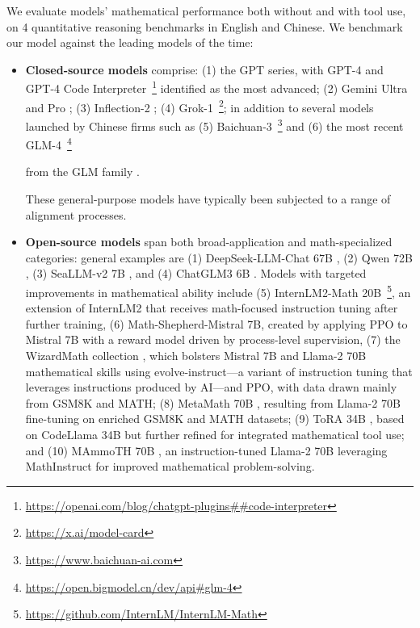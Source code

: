 \begin{itemize}[topsep=0pt]
We evaluate models' mathematical performance both without and with tool use, on 4 quantitative reasoning benchmarks in English and Chinese. We benchmark our model against the leading models of the time:

\begin{itemize}[topsep=0pt]
    \item \textbf{Closed-source models} comprise: (1) the GPT series, with GPT-4 \citep{gpt4} and GPT-4 Code Interpreter~\footnote{\url{https://openai.com/blog/chatgpt-plugins\#\#code-interpreter}} identified as the most advanced; (2) Gemini Ultra and Pro \citep{gemini}; (3) Inflection-2 \citep{inflection-2}; (4) Grok-1~\footnote{\url{https://x.ai/model-card}}; in addition to several models launched by Chinese firms such as (5) Baichuan-3~\footnote{\url{https://www.baichuan-ai.com}} and (6) the most recent GLM-4~\footnote{\url{https://open.bigmodel.cn/dev/api\#glm-4}}

    from the GLM family \citep{glm}.

These general-purpose models have typically been subjected to a range of alignment processes.  
\item \textbf{Open-source models} span both broad-application and math-specialized categories: general examples are (1) DeepSeek-LLM-Chat 67B \citep{deepseek-llm}, (2) Qwen 72B \citep{qwen}, (3) SeaLLM-v2 7B \citep{seallm}, and (4) ChatGLM3 6B \citep{chatglm3}. Models with targeted improvements in mathematical ability include (5) InternLM2-Math 20B~\footnote{\url{https://github.com/InternLM/InternLM-Math}}, an extension of InternLM2 that receives math-focused instruction tuning after further training, (6) Math-Shepherd-Mistral 7B, created by applying PPO \citep{schulman2017proximal} to Mistral 7B \citep{mistral} with a reward model driven by process-level supervision, (7) the WizardMath collection \citep{wizardmath}, which bolsters Mistral 7B and Llama-2 70B \citep{llama2} mathematical skills using evolve-instruct—a variant of instruction tuning that leverages instructions produced by AI—and PPO, with data drawn mainly from GSM8K and MATH; (8) MetaMath 70B \citep{metamath}, resulting from Llama-2 70B fine-tuning on enriched GSM8K and MATH datasets; (9) ToRA 34B \cite{tora}, based on CodeLlama 34B but further refined for integrated mathematical tool use; and (10) MAmmoTH 70B \citep{MathInstruct}, an instruction-tuned Llama-2 70B leveraging MathInstruct for improved mathematical problem-solving.
\end{itemize}


\end{itemize}
